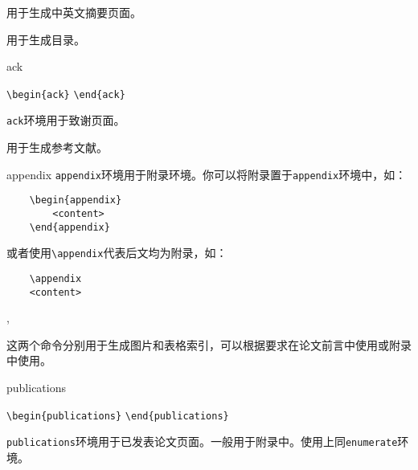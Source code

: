 \documentclass[12pt,a4paper,numbered,full]{l3doc}
\begin{document}
\begin{function}{\makeabstract}
    用于生成中英文摘要页面。
\end{function}

\begin{function}{\tableofcontents}
    用于生成目录。
\end{function}

\begin{function}{ack}
    \begin{syntax}
    \verb+\begin{ack}+
    \hspace{2em}
    \verb+\end{ack}+
    \end{syntax}
    \verb+ack+环境用于致谢页面。
\end{function}

\begin{function}{}
    \begin{syntax}
    \end{syntax}
    用于生成参考文献。
\end{function}

\begin{function}{appendix}
    \verb+appendix+环境用于附录环境。你可以将附录置于\verb+appendix+环境中，如：
    \begin{verbatim}
    \begin{appendix}
        <content>
    \end{appendix}
    \end{verbatim}
    或者使用\verb+\appendix+代表后文均为附录，如：
    \begin{verbatim}
    \appendix
    <content>
    \end{verbatim}
\end{function}

\begin{function}{\listoffigures,\listoftables}
    这两个命令分别用于生成图片和表格索引，可以根据要求在论文前言中使用或附录中使用。
\end{function}

\begin{function}{publications}
    \begin{syntax}
    \verb+\begin{publications}+
    \hspace{2em} 
    \hspace{2em}\meta{$\cdots$}
    \verb+\end{publications}+
    \end{syntax}
    \verb+publications+环境用于已发表论文页面。一般用于附录中。使用上同\verb+enumerate+环境。
\end{function}
\end{document}
